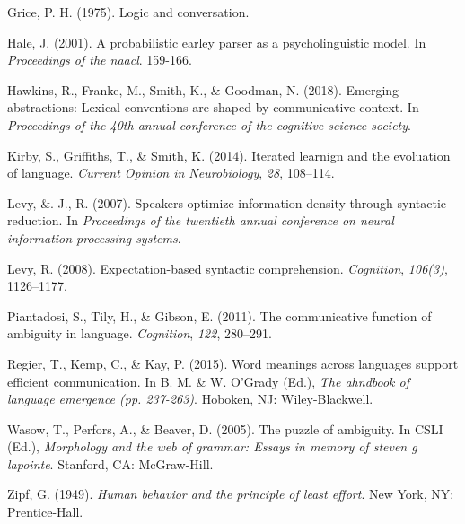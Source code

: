 \documentclass[10pt, letterpaper]{article}
\begin{document}
\hypertarget{ref-Grice1975a}{}
Grice, P. H. (1975). Logic and conversation.

\hypertarget{ref-Hale2001a}{}
Hale, J. (2001). A probabilistic earley parser as a psycholinguistic
model. In \emph{Proceedings of the naacl}. 159-166.

\hypertarget{ref-HawkinsFrankeSmithGoodman2018a}{}
Hawkins, R., Franke, M., Smith, K., \& Goodman, N. (2018). Emerging
abstractions: Lexical conventions are shaped by communicative context.
In \emph{Proceedings of the 40th annual conference of the cognitive
science society}.

\hypertarget{ref-KirbyGriffithsSmith2014a}{}
Kirby, S., Griffiths, T., \& Smith, K. (2014). Iterated learnign and the
evoluation of language. \emph{Current Opinion in Neurobiology},
\emph{28}, 108--114.

\hypertarget{ref-LevyJaeger2007a}{}
Levy, \&. J., R. (2007). Speakers optimize information density through
syntactic reduction. In \emph{Proceedings of the twentieth annual
conference on neural information processing systems}.

\hypertarget{ref-Levy2008a}{}
Levy, R. (2008). Expectation-based syntactic comprehension.
\emph{Cognition}, \emph{106(3)}, 1126--1177.

\hypertarget{ref-Piantadosi2011a}{}
Piantadosi, S., Tily, H., \& Gibson, E. (2011). The communicative
function of ambiguity in language. \emph{Cognition}, \emph{122},
280--291.

\hypertarget{ref-RegierKempKay2015a}{}
Regier, T., Kemp, C., \& Kay, P. (2015). Word meanings across languages
support efficient communication. In B. M. \& W. O'Grady (Ed.), \emph{The
ahndbook of language emergence (pp. 237-263)}. Hoboken, NJ:
Wiley-Blackwell.

\hypertarget{ref-WasowPerforsBeaver2005a}{}
Wasow, T., Perfors, A., \& Beaver, D. (2005). The puzzle of ambiguity.
In CSLI (Ed.), \emph{Morphology and the web of grammar: Essays in memory
of steven g lapointe}. Stanford, CA: McGraw-Hill.

\hypertarget{ref-Zipf1949a}{}
Zipf, G. (1949). \emph{Human behavior and the principle of least
effort}. New York, NY: Prentice-Hall.


\end{document}
